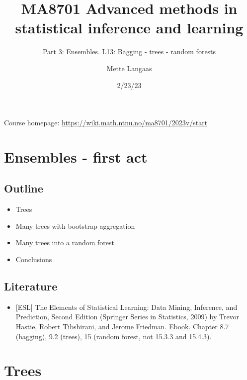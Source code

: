 \documentclass[
  letterpaper,
  DIV=11,
  numbers=noendperiod]{scrartcl}
\title{MA8701 Advanced methods in statistical inference and learning}
\subtitle{Part 3: Ensembles. L13: Bagging - trees - random forests}
\author{Mette Langaas}
\date{2/23/23}
\providecommand{\tightlist}{%
  \setlength{\itemsep}{0pt}\setlength{\parskip}{0pt}}\usepackage{longtable,booktabs,array}
\renewcommand*\contentsname{Table of contents}
\newcommand\contentsname{Table of contents}
\begin{document}
\maketitle
\ifdefined\Shaded\renewenvironment{Shaded}{\begin{tcolorbox}[sharp corners, interior hidden, borderline west={3pt}{0pt}{shadecolor}, boxrule=0pt, frame hidden, enhanced, breakable]}{\end{tcolorbox}}\fi

\renewcommand*\contentsname{Table of contents}
{
\hypersetup{linkcolor=}
\setcounter{tocdepth}{3}
\tableofcontents
}
Course homepage: \url{https://wiki.math.ntnu.no/ma8701/2023v/start}

\hypertarget{ensembles---first-act}{%
\section{Ensembles - first act}\label{ensembles---first-act}}

\hypertarget{outline}{%
\subsection{Outline}\label{outline}}

\begin{itemize}
\tightlist
\item
  Trees
\item
  Many trees with bootstrap aggregation
\item
  Many trees into a random forest
\item
  Conclusions
\end{itemize}

\hypertarget{literature}{%
\subsection{Literature}\label{literature}}

\begin{itemize}
\tightlist
\item
  {[}ESL{]} The Elements of Statistical Learning: Data Mining,
  Inference, and Prediction, Second Edition (Springer Series in
  Statistics, 2009) by Trevor Hastie, Robert Tibshirani, and Jerome
  Friedman.
  \href{https://hastie.su.domains/ElemStatLearn/download.html}{Ebook}.
  Chapter 8.7 (bagging), 9.2 (trees), 15 (random forest, not 15.3.3 and
  15.4.3).
\end{itemize}

\hypertarget{trees}{%
\section{Trees}\label{trees}}
\end{document}
